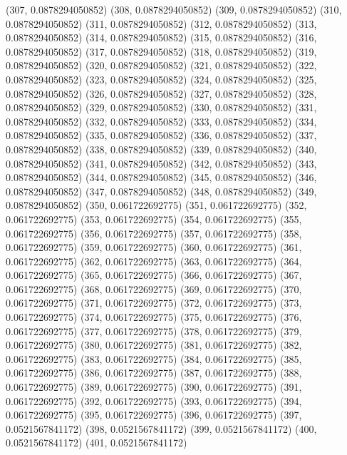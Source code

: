{					(307, 0.0878294050852)
					(308, 0.0878294050852)
					(309, 0.0878294050852)
					(310, 0.0878294050852)
					(311, 0.0878294050852)
					(312, 0.0878294050852)
					(313, 0.0878294050852)
					(314, 0.0878294050852)
					(315, 0.0878294050852)
					(316, 0.0878294050852)
					(317, 0.0878294050852)
					(318, 0.0878294050852)
					(319, 0.0878294050852)
					(320, 0.0878294050852)
					(321, 0.0878294050852)
					(322, 0.0878294050852)
					(323, 0.0878294050852)
					(324, 0.0878294050852)
					(325, 0.0878294050852)
					(326, 0.0878294050852)
					(327, 0.0878294050852)
					(328, 0.0878294050852)
					(329, 0.0878294050852)
					(330, 0.0878294050852)
					(331, 0.0878294050852)
					(332, 0.0878294050852)
					(333, 0.0878294050852)
					(334, 0.0878294050852)
					(335, 0.0878294050852)
					(336, 0.0878294050852)
					(337, 0.0878294050852)
					(338, 0.0878294050852)
					(339, 0.0878294050852)
					(340, 0.0878294050852)
					(341, 0.0878294050852)
					(342, 0.0878294050852)
					(343, 0.0878294050852)
					(344, 0.0878294050852)
					(345, 0.0878294050852)
					(346, 0.0878294050852)
					(347, 0.0878294050852)
					(348, 0.0878294050852)
					(349, 0.0878294050852)
					(350, 0.061722692775)
					(351, 0.061722692775)
					(352, 0.061722692775)
					(353, 0.061722692775)
					(354, 0.061722692775)
					(355, 0.061722692775)
					(356, 0.061722692775)
					(357, 0.061722692775)
					(358, 0.061722692775)
					(359, 0.061722692775)
					(360, 0.061722692775)
					(361, 0.061722692775)
					(362, 0.061722692775)
					(363, 0.061722692775)
					(364, 0.061722692775)
					(365, 0.061722692775)
					(366, 0.061722692775)
					(367, 0.061722692775)
					(368, 0.061722692775)
					(369, 0.061722692775)
					(370, 0.061722692775)
					(371, 0.061722692775)
					(372, 0.061722692775)
					(373, 0.061722692775)
					(374, 0.061722692775)
					(375, 0.061722692775)
					(376, 0.061722692775)
					(377, 0.061722692775)
					(378, 0.061722692775)
					(379, 0.061722692775)
					(380, 0.061722692775)
					(381, 0.061722692775)
					(382, 0.061722692775)
					(383, 0.061722692775)
					(384, 0.061722692775)
					(385, 0.061722692775)
					(386, 0.061722692775)
					(387, 0.061722692775)
					(388, 0.061722692775)
					(389, 0.061722692775)
					(390, 0.061722692775)
					(391, 0.061722692775)
					(392, 0.061722692775)
					(393, 0.061722692775)
					(394, 0.061722692775)
					(395, 0.061722692775)
					(396, 0.061722692775)
					(397, 0.0521567841172)
					(398, 0.0521567841172)
					(399, 0.0521567841172)
					(400, 0.0521567841172)
					(401, 0.0521567841172)
}
